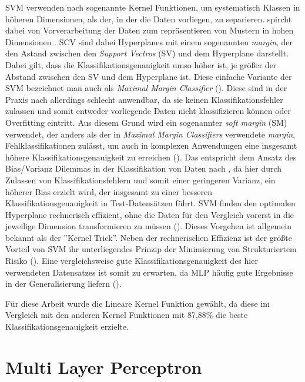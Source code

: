 SVM verwenden nach \cite{duda2012pattern} sogenannte Kernel Funktionen, um systematisch Klassen in höheren Dimensionen, als der, in der die Daten vorliegen, zu separieren. \cite{duda2012pattern} spircht dabei von \glqq[der] Vorverarbeitung der Daten zum repräsentieren von Mustern in hohen Dimensionen\grqq{} \cite{duda2012pattern}. SCV sind dabei Hyperplanes mit einem sogenannten \textit{margin}, der den Astand zwischen den \textit{Support Vectros} (SV) und dem Hyperplane darstellt. Dabei gilt, dass die Klassifikationsgenauigkeit umso höher ist, je größer der Abstand zwischen den SV und dem Hyperplane ist. Diese einfache Variante der SVM bezeichnet man auch als \textit{Maximal Margin Classifier} (\cite{cristianini2000}). Diese sind in der Praxis nach \cite{cristianini2000} allerdings schlecht anwendbar, da sie keinen Klassifikationsfehler zulassen und somit entweder vorliegende Daten nicht klassifizieren können oder Overfitting eintritt. Aus diesem Grund wird ein sogenannter \textit{soft margin} (SM) verwendet, der anders als der in \textit{Maximal Margin Classifiers} verwendete \textit{margin}, Fehlklassifikationen zulässt, um auch in komplexen Anwendungen eine insgesamt höhere Klassifikationsgenauigkeit zu erreichen (\cite{cristianini2000}). Das entspricht dem Ansatz des \glqq Bias/Varianz Dilemmas\grqq{} in der Klassifikation von Daten nach \cite{friedman1997bias}, da hier durch Zulassen von Klassifikationsfehlern und somit einer geringeren Varianz, ein höherer Bias erzielt wird, der insgesamt zu einer besseren Klassifikationsgenauigkeit in Test-Datensätzen führt. SVM finden den optimalen Hyperplane rechnerisch effizient, ohne die Daten für den Vergleich vorerst in die jeweilige Dimension transformieren zu müssen (\cite{cristianini2000}). Dieses Vorgehen ist allgemein bekannt als der ''Kernel Trick''. Neben der rechnerischen Effizienz ist der größte Vorteil von SVM ihr unterliegendes Prinzip der Minimierung von Strukturiertem Risiko (\cite{Kaufmann2013}). Eine vergleichsweise gute Klassifikationsgenauigkeit des hier verwendeten Datensatzes ist somit zu erwarten, da MLP häufig gute Ergebnisse in der Generalisierung liefern (\cite{Kaufmann2013}).

Für diese Arbeit wurde die Lineare Kernel Funktion gewählt, da diese im Vergleich mit den anderen Kernel Funktionen mit 87,88\% die beste Klassifikationsgenauigkeit erzielte.

\section{Multi Layer Perceptron}
\label{sec:mlp}

